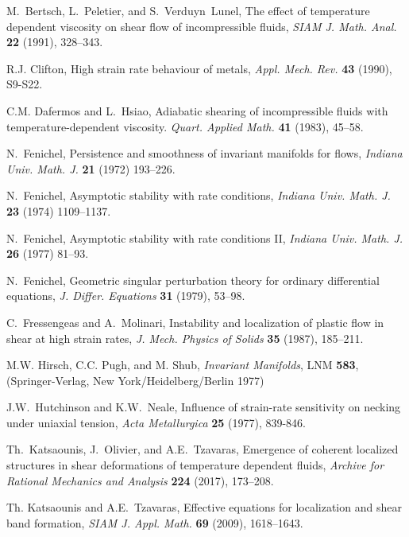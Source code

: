 \documentclass[a4paper,11pt]{article}
\theoremstyle{remark}
\begin{document}
\begin{thebibliography}{10}

{\sc M.~Bertsch, L.~Peletier, and S.~Verduyn~Lunel},
The effect of temperature dependent viscosity on shear flow of  incompressible fluids,
{\it SIAM J. Math. Anal.} {\bf 22 } (1991), 328--343.

{\sc R.J. Clifton},  High strain rate behaviour of metals,
{\it Appl. Mech. Rev.}
{\bf 43} (1990), S9-S22.

{\sc C.M. Dafermos and L.~Hsiao},
Adiabatic shearing of incompressible fluids with temperature-dependent viscosity.
{\it Quart.  Applied Math.} {\bf 41} (1983), 45--58.

{\sc N.~Fenichel},
Persistence and smoothness of invariant manifolds for  flows,
{\it Indiana Univ. Math. J.} {\bf 21} (1972) 193--226.

{\sc N.~Fenichel},
Asymptotic stability with rate conditions,
{\it Indiana Univ. Math. J.} {\bf 23} (1974) 1109--1137.

{\sc N.~Fenichel},
Asymptotic stability with rate conditions \textrm{II},
{\it Indiana Univ. Math. J.} {\bf 26} (1977) 81--93.

{\sc N.~Fenichel},
Geometric singular perturbation theory for ordinary differential equations,
{\it J. Differ. Equations} {\bf 31} (1979), 53--98.

{\sc C.~Fressengeas and A.~Molinari},
Instability and localization of plastic flow in shear at high strain rates,
{\it J.  Mech. Physics of Solids} {\bf 35} (1987), 185--211.

{\sc M.W. Hirsch, C.C. Pugh, and M. Shub},
{\it Invariant Manifolds}, LNM {\bf 583}, (Springer-Verlag, New York/Heidelberg/Berlin 1977)

{\sc J.W.~Hutchinson and K.W.~Neale},
Influence of strain-rate sensitivity on necking under uniaxial tension,
{\it  Acta Metallurgica} {\bf 25} (1977), 839-846.

{\sc Th.~Katsaounis, J.~Olivier, and A.E.~Tzavaras},
Emergence of coherent localized structures in shear deformations of temperature dependent fluids,
{\it Archive for Rational Mechanics and Analysis} {\bf 224} (2017), 173--208.

{\sc Th. Katsaounis and A.E.~Tzavaras},
Effective equations for localization and shear band formation,
{\it SIAM J. Appl. Math.}  {\bf 69} (2009), 1618--1643.


\end{thebibliography}
\end{document}

